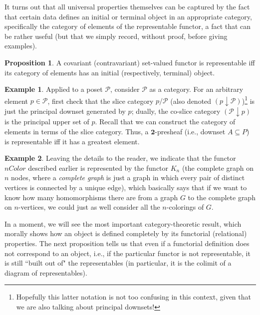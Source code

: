 \documentclass[11pt]{book}
\theoremstyle{definition}
\newtheorem{example}{Example}[section]
\theoremstyle{definition}
\theoremstyle{definition}
\newtheorem{proposition}{Proposition}[section]
\theoremstyle{theorem}
\theoremstyle{definition}
\begin{document}
It turns out that all universal properties themselves can be captured by the fact that certain data defines an initial or terminal object in an appropriate category, specifically the category of elements of the representable functor, a fact that can be rather useful (but that we simply record, without proof, before giving examples). 
\begin{proposition} \label{representable}
	A covariant (contravariant) set-valued functor is representable iff its category of elements has an initial (respectively, terminal) object.
\end{proposition} 
\begin{example}
	Applied to a poset $\mathcal{P}$, consider $\mathcal{P}$ as a category. For an arbitrary element $p \in \mathcal{P}$, first check that the slice category $p / \mathcal{P}$ (also denoted $(p\downarrow \mathcal{P})$)\footnote{Hopefully this latter notation is not too confusing in this context, given that we are also talking about principal downsets!} is just the principal downset generated by $p$; dually, the co-slice category $(\mathcal{P} \downarrow p)$ is the principal upper set of $p$. Recall that we can construct the category of elements in terms of the slice category. Thus, a $\textbf{2}$-presheaf (i.e., downset $A \subseteq  P$) is representable iff it has a greatest element.  
\end{example}
\begin{example}
	Leaving the details to the reader, we indicate that the functor $nColor$  described earlier is represented by the functor $K_n$ (the complete graph on $n$ nodes, where a \textit{complete graph} is just a graph in which every pair of distinct vertices is connected by a unique edge), which basically says that if we want to know how many homomorphisms there are from a graph $G$ to the complete graph on $n$-vertices, we could just as well consider all the $n$-colorings of $G$.  
\end{example} \noindent 
In a moment, we will see the most important category-theoretic result, which morally shows how an object is defined completely by its functorial (relational) properties. The next proposition tells us that even if a functorial definition does not correspond to an object, i.e., if the particular functor is not representable, it is still ``built out of" the representables (in particular, it is the colimit of a diagram of representables). 
\end{document}
